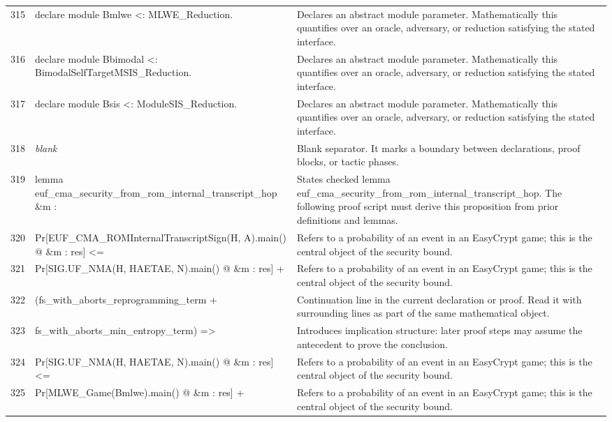 \documentclass[10pt]{article}
\begin{document}
\begin{longtable}{r L{0.53\textwidth} L{0.37\textwidth}}
315 & {\ttfamily\scriptsize declare module Bmlwe <: MLWE\_Reduction.} & Declares an abstract module parameter.  Mathematically this quantifies over an oracle, adversary, or reduction satisfying the stated interface. \\
316 & {\ttfamily\scriptsize declare module Bbimodal <: BimodalSelfTargetMSIS\_Reduction.} & Declares an abstract module parameter.  Mathematically this quantifies over an oracle, adversary, or reduction satisfying the stated interface. \\
317 & {\ttfamily\scriptsize declare module Bsis <: ModuleSIS\_Reduction.} & Declares an abstract module parameter.  Mathematically this quantifies over an oracle, adversary, or reduction satisfying the stated interface. \\
318 & {\ttfamily\scriptsize \emph{blank}} & Blank separator.  It marks a boundary between declarations, proof blocks, or tactic phases. \\
319 & {\ttfamily\scriptsize lemma euf\_cma\_security\_from\_rom\_internal\_transcript\_hop \&m :} & States checked lemma euf\_cma\_security\_from\_rom\_internal\_transcript\_hop.  The following proof script must derive this proposition from prior definitions and lemmas. \\
320 & {\ttfamily\scriptsize   Pr[EUF\_CMA\_ROMInternalTranscriptSign(H, A).main() @ \&m : res] <=} & Refers to a probability of an event in an EasyCrypt game; this is the central object of the security bound. \\
321 & {\ttfamily\scriptsize     Pr[SIG.UF\_NMA(H, HAETAE, N).main() @ \&m : res] +} & Refers to a probability of an event in an EasyCrypt game; this is the central object of the security bound. \\
322 & {\ttfamily\scriptsize     (fs\_with\_aborts\_reprogramming\_term +} & Continuation line in the current declaration or proof.  Read it with surrounding lines as part of the same mathematical object. \\
323 & {\ttfamily\scriptsize       fs\_with\_aborts\_min\_entropy\_term) =>} & Introduces implication structure: later proof steps may assume the antecedent to prove the conclusion. \\
324 & {\ttfamily\scriptsize   Pr[SIG.UF\_NMA(H, HAETAE, N).main() @ \&m : res] <=} & Refers to a probability of an event in an EasyCrypt game; this is the central object of the security bound. \\
325 & {\ttfamily\scriptsize     Pr[MLWE\_Game(Bmlwe).main() @ \&m : res] +} & Refers to a probability of an event in an EasyCrypt game; this is the central object of the security bound. \\

\end{longtable}
\end{document}
